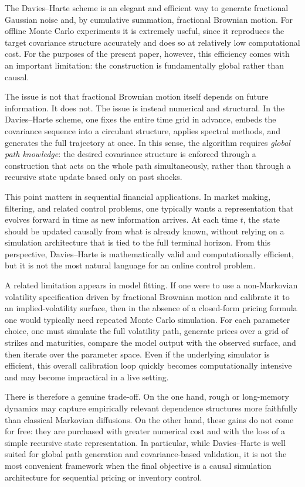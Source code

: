 \documentclass[a4paper,10pt,titlepage,oneside,openany]{book}
\theoremstyle{plain}
\theoremstyle{definition}
\theoremstyle{remark}
\newcommand{\1}{\mathbf{1}}
\begin{document}
The Davies--Harte scheme is an elegant and efficient way to generate fractional Gaussian noise and, by cumulative summation, fractional Brownian motion. For offline Monte Carlo experiments it is extremely useful, since it reproduces the target covariance structure accurately and does so at relatively low computational cost. For the purposes of the present paper, however, this efficiency comes with an important limitation: the construction is fundamentally global rather than causal.

The issue is not that fractional Brownian motion itself depends on future information. It does not. The issue is instead numerical and structural. In the Davies--Harte scheme, one fixes the entire time grid in advance, embeds the covariance sequence into a circulant structure, applies spectral methods, and generates the full trajectory at once. In this sense, the algorithm requires \emph{global path knowledge}: the desired covariance structure is enforced through a construction that acts on the whole path simultaneously, rather than through a recursive state update based only on past shocks.

This point matters in sequential financial applications. In market making, filtering, and related control problems, one typically wants a representation that evolves forward in time as new information arrives. At each time \(t\), the state should be updated causally from what is already known, without relying on a simulation architecture that is tied to the full terminal horizon. From this perspective, Davies--Harte is mathematically valid and computationally efficient, but it is not the most natural language for an online control problem.

A related limitation appears in model fitting. If one were to use a non-Markovian volatility specification driven by fractional Brownian motion and calibrate it to an implied-volatility surface, then in the absence of a closed-form pricing formula one would typically need repeated Monte Carlo simulation. For each parameter choice, one must simulate the full volatility path, generate prices over a grid of strikes and maturities, compare the model output with the observed surface, and then iterate over the parameter space. Even if the underlying simulator is efficient, this overall calibration loop quickly becomes computationally intensive and may become impractical in a live setting.

There is therefore a genuine trade-off. On the one hand, rough or long-memory dynamics may capture empirically relevant dependence structures more faithfully than classical Markovian diffusions. On the other hand, these gains do not come for free: they are purchased with greater numerical cost and with the loss of a simple recursive state representation. In particular, while Davies--Harte is well suited for global path generation and covariance-based validation, it is not the most convenient framework when the final objective is a causal simulation architecture for sequential pricing or inventory control.
\end{document}
